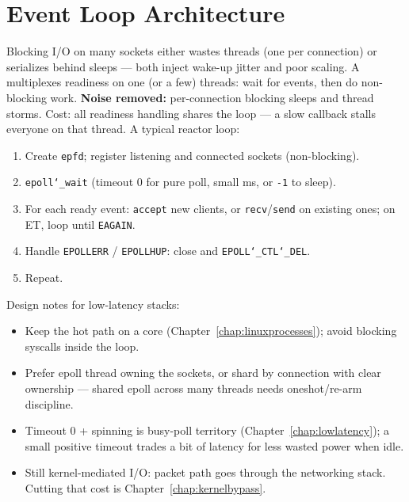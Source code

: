 \section{Event Loop Architecture}
\label{sec:event-loop-architecture}
Blocking I/O on many sockets either wastes threads (one per connection) or serializes 
behind sleeps --- both inject wake-up jitter and poor scaling. A  
multiplexes readiness on one (or a few) threads: wait for events, then do non-blocking work.
\newline
\textbf{Noise removed:} per-connection blocking sleeps and thread storms. Cost: all 
readiness handling shares the loop --- a slow callback stalls everyone on that thread.
\newline
A typical reactor loop:
\begin{enumerate}
    \item Create \texttt{epfd}; register listening and connected sockets (non-blocking).
    \item \texttt{epoll\char`_wait} (timeout 0 for pure poll, small ms, or \texttt{-1} to sleep).
    \item For each ready event: \texttt{accept} new clients, or \texttt{recv}/\texttt{send} 
          on existing ones; on ET, loop until \texttt{EAGAIN}.
    \item Handle \texttt{EPOLLERR} / \texttt{EPOLLHUP}: close and \texttt{EPOLL\char`_CTL\char`_DEL}.
    \item Repeat.
\end{enumerate}
Design notes for low-latency stacks:
\begin{itemize}
    \item Keep the hot path on a  core (Chapter~\ref{chap:linuxprocesses}); 
          avoid blocking syscalls inside the loop.
    \item Prefer  epoll thread owning the sockets, or shard by connection with 
          clear ownership --- shared epoll across many threads needs oneshot/re-arm discipline.
    \item Timeout 0 + spinning is busy-poll territory (Chapter~\ref{chap:lowlatency}); a small 
          positive timeout trades a bit of latency for less wasted power when idle.
    \item Still kernel-mediated I/O: packet path goes through the networking stack. Cutting 
          that cost is Chapter~\ref{chap:kernelbypass}.
\end{itemize}

